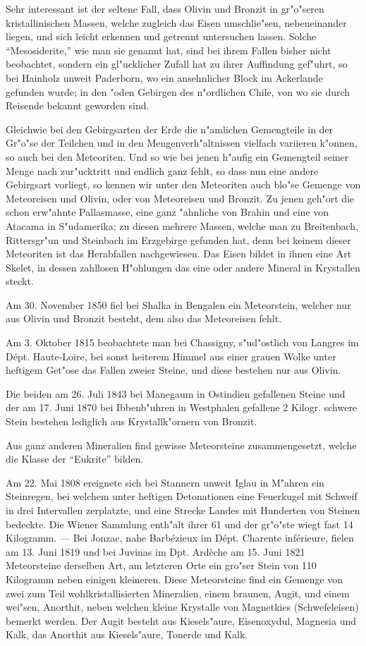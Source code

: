\documentclass[a4paper, 11pt, oneside, german]{article}
\begin{document}
Sehr interessant ist der seltene Fall, dass Olivin und Bronzit in gr"o"seren kristallinischen Massen, welche zugleich das Eisen umschlie"sen, nebeneinander liegen, und sich leicht erkennen und getrennt untersuchen lassen. Solche "`Mesosiderite,"' wie man sie genannt hat, sind bei ihrem Fallen bisher nicht beobachtet, sondern ein gl"ucklicher Zufall hat zu ihrer Auffindung gef"uhrt, so bei Hainholz unweit Paderborn, wo ein ansehnlicher Block im Ackerlande gefunden wurde; in den "oden Gebirgen des n"ordlichen Chile, von wo sie durch Reisende bekannt geworden sind.

Gleichwie bei den Gebirgsarten der Erde die n"amlichen Gemengteile in der Gr"o"se der Teilchen und in den Mengenverh"altnissen vielfach variieren k"onnen, so auch bei den Meteoriten. Und so wie bei jenen h"aufig ein Gemengteil seiner Menge nach zur"ucktritt und endlich ganz fehlt, so dass nun eine andere Gebirgsart vorliegt, so kennen wir unter den Meteoriten auch blo"se Gemenge von Meteoreisen und Olivin, oder von Meteoreisen und Bronzit. Zu jenen geh"ort die schon erw"ahnte Pallasmasse, eine ganz "ahnliche von Brahin und eine von Atacama in S"udamerika; zu diesen mehrere Massen, welche man zu Breitenbach, Rittersgr"un und Steinbach im Erzgebirge gefunden hat, denn bei keinem dieser Meteoriten ist das Herabfallen nachgewiesen. Das Eisen bildet in ihnen eine Art Skelet, in dessen zahllosen H"ohlungen das eine oder andere Mineral in Krystallen steckt.

Am 30. November 1850 fiel bei Shalka in Bengalen ein Meteorstein, welcher nur aus Olivin und Bronzit besteht, dem also das Meteoreisen fehlt.

Am 3. Oktober 1815 beobachtete man bei Chassigny, s"ud"ostlich von Langres im Dépt. Haute-Loire, bei sonst heiterem Himmel aus einer grauen Wolke unter heftigem Get"ose das Fallen zweier Steine, und diese bestehen nur aus Olivin.

Die beiden am 26. Juli 1843 bei Manegaum in Ostindien gefallenen Steine und der am 17. Juni 1870 bei Ibbenb"uhren in Westphalen gefallene 2 Kilogr. schwere Stein bestehen lediglich aus Krystallk"ornern von Bronzit.

Aus ganz anderen Mineralien find gewisse Meteorsteine zusammengesetzt, welche die Klasse der "`Eukrite"' bilden.

Am 22. Mai 1808 ereignete sich bei Stannern unweit Iglau in M"ahren ein Steinregen, bei welchem unter heftigen Detonationen eine Feuerkugel mit Schweif in drei Intervallen zerplatzte, und eine Strecke Landes mit Hunderten von Steinen bedeckte. Die Wiener Sammlung enth"alt ihrer 61 und der gr"o"ste wiegt fast 14 Kilogramm. --- Bei Jonzac, nahe Barbézieux im Dépt. Charente inférieure, fielen am 13. Juni 1819 und bei Juvinas im Dpt. Ardèche am 15. Juni 1821 Meteorsteine derselben Art, am letzteren Orte ein gro"ser Stein von 110 Kilogramm neben einigen kleineren. Diese Meteorsteine find ein Gemenge von zwei zum Teil wohlkristallisierten Mineralien, einem braunen, Augit, und einem wei"sen, Anorthit, neben welchen kleine Krystalle von Magnetkies (Schwefeleisen) bemerkt werden. Der Augit besteht aus Kiesels"aure, Eisenoxydul, Magnesia und Kalk, das Anorthit aus Kiesels"aure, Tonerde und Kalk.
\end{document}
